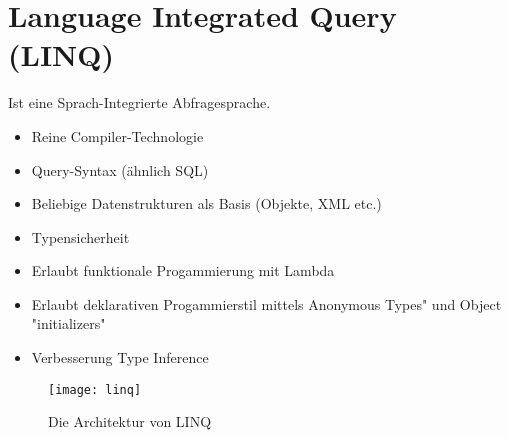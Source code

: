 \section{Language Integrated Query (LINQ)}
Ist eine Sprach-Integrierte Abfragesprache.
\begin{itemize}
	\itemsep -0.5em 
	\item Reine Compiler-Technologie
	\item Query-Syntax (ähnlich SQL)
	\item Beliebige Datenstrukturen als Basis (Objekte, XML etc.)
	\item Typensicherheit
	\item Erlaubt funktionale Progammierung mit Lambda
	\item Erlaubt deklarativen Progammierstil mittels Anonymous Types" und Object "initializers"
	\item Verbesserung Type Inference
\end{itemize}

\begin{figure}[h!]
	\centering
	\texttt{[image: linq]}
  \caption{Die Architektur von LINQ}
\end{figure}


